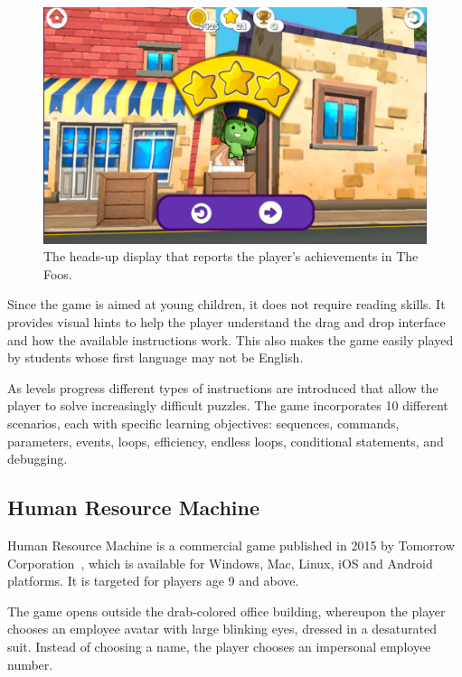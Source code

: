 \documentclass{sig-alternate-05-2015}
\begin{document}
\begin{figure}[tb]
\centering
\includegraphics[width=\linewidth]{images/image00.png}
\caption{The heads-up display that reports the player's achievements in The Foos.}
\label{figure:fooshud}
\end{figure}


Since the game is aimed at young children, it does not require reading skills. It provides visual hints to help the player understand the drag and drop interface and how the available instructions work. This also makes the game easily played by students whose first language may not be English.



As levels progress different types of instructions are introduced that allow the player to solve increasingly difficult puzzles. The game incorporates 10 different scenarios, each with specific learning objectives: sequences, commands, parameters, events, loops, efficiency, endless loops, conditional statements, and debugging.



\subsection{Human Resource Machine}


Human Resource Machine is a commercial game published in 2015 by Tomorrow Corporation~\cite{tomorrowcorporation}, which is available for Windows, Mac, Linux, iOS and Android platforms. It is targeted for players age 9 and above. 



The game opens outside the drab-colored office building, whereupon the player chooses an employee avatar with large blinking eyes, dressed in a desaturated suit. Instead of choosing a name, the player chooses an impersonal employee number. 
\end{document}
